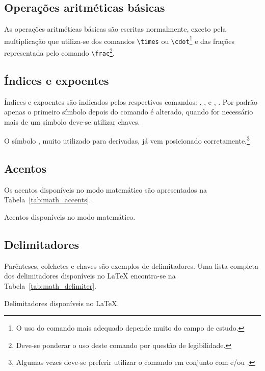 \subsection{Operações aritméticas básicas}
As operações aritméticas básicas são escritas normalmente, exceto pela multiplicação que utiliza-se dos comandos \lstinline!\times! ou \lstinline!\cdot!\footnote{O uso do comando mais adequado depende muito do campo de estudo.} e das frações representada pelo comando \lstinline!\frac!\footnote{Deve-se ponderar o uso deste comando por quest\~{a}o de legibilidade.}. \\

\subsection{Índices e expoentes}
\'{I}ndices e expoentes são indicados pelos respectivos comandos: , \lcode{_}, e , \lcode{^}. Por padrão apenas o primeiro símbolo depois do comando é alterado, quando for necessário mais de um símbolo deve-se utilizar chaves.

O símbolo , muito utilizado para derivadas, já vem posicionado corretamente.\footnote{Algumas vezes deve-se preferir utilizar o comando  em conjunto com  e/ou .} \\

\subsection{Acentos}
Os acentos disponíveis no modo matemático são apresentados na Tabela~\ref{tab:math_accents}.
\begin{table}[h!tb]
    \centering
    \caption{Acentos disponíveis no modo matemático.}
    \label{tab:math_accents}
    
\end{table}

\subsection{Delimitadores}
Parênteses, colchetes e chaves são exemplos de delimitadores. Uma lista completa dos delimitadores dispon\'{i}veis no LaTeX encontra-se na Tabela~\ref{tab:math_delimiter}.
\begin{table}[h!tb]
    \centering
    \caption{Delimitadores disponíveis no LaTeX.}
    \label{tab:math_delimiter}
    
\end{table}

